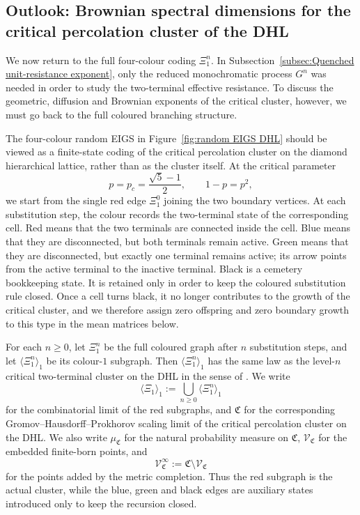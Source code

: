 \documentclass{article}
\theoremstyle{plain}
\theoremstyle{definition}
\begin{document}










\subsection{Outlook: Brownian spectral dimensions for the critical percolation cluster of the DHL}\label{subsec:dhl_cluster}

We now return to the full four-colour coding $\Xi_1^n$.
In Subsection~\ref{subsec:Quenched unit-resistance exponent}, only the reduced monochromatic process $G^n$ was needed in order to study the two-terminal effective resistance.
To discuss the geometric, diffusion and Brownian exponents of the critical cluster, however, we must go back to the full coloured branching structure.

The four-colour random EIGS in Figure~\ref{fig:random EIGS DHL} should be viewed as a finite-state coding of the critical percolation cluster on the diamond hierarchical lattice, rather than as the cluster itself.
At the critical parameter
\[
p=p_c=\frac{\sqrt5-1}{2},
\qquad
1-p=p^2,
\]
we start from the single red edge $\Xi_1^0$ joining the two boundary vertices.
At each substitution step, the colour records the two-terminal state of the corresponding cell.
Red means that the two terminals are connected inside the cell.
Blue means that they are disconnected, but both terminals remain active.
Green means that they are disconnected, but exactly one terminal remains active; its arrow points from the active terminal to the inactive terminal.
Black is a cemetery bookkeeping state.
It is retained only in order to keep the coloured substitution rule closed.
Once a cell turns black, it no longer contributes to the growth of the critical cluster, and we therefore assign zero offspring and zero boundary growth to this type in the mean matrices below.

For each $n\ge 0$, let $\Xi_1^n$ be the full coloured graph after $n$ substitution steps, and let $\langle \Xi_1^n\rangle_1$ be its colour-$1$ subgraph.
Then $\langle \Xi_1^n\rangle_1$ has the same law as the level-$n$ critical two-terminal cluster on the DHL in the sense of \cite{hambly2010diffusion}.
We write
\[
\langle \Xi_1\rangle_1:=\bigcup_{n\ge 0}\langle \Xi_1^n\rangle_1
\]
for the combinatorial limit of the red subgraphs, and $\mathfrak C$ for the corresponding Gromov--Hausdorff--Prokhorov scaling limit of the critical percolation cluster on the DHL.
We also write $\mu_{\mathfrak C}$ for the natural probability measure on $\mathfrak C$, $\mathscr V_{\mathfrak C}$ for the embedded finite-born points, and
\[
\mathscr V_{\mathfrak C}^{\infty}:=\mathfrak C\setminus \mathscr V_{\mathfrak C}
\]
for the points added by the metric completion.
Thus the red subgraph is the actual cluster, while the blue, green and black edges are auxiliary states introduced only to keep the recursion closed.
\end{document}
